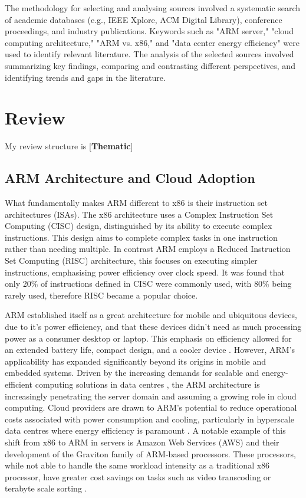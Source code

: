 \documentclass[conference]{IEEEtran}  %
\begin{document}
The methodology for selecting and analysing sources involved a systematic search of academic databases (e.g., IEEE Xplore, ACM Digital Library), conference proceedings, and industry publications. Keywords such as "ARM server," "cloud computing architecture," "ARM vs. x86," and "data center energy efficiency" were used to identify relevant literature. The analysis of the selected sources involved summarizing key findings, comparing and contrasting different perspectives, and identifying trends and gaps in the literature.


\section{Review} %

My review structure is [\textbf{Thematic}]
\subsection{ARM Architecture and Cloud Adoption}
What fundamentally makes ARM different to x86 is their instruction set architectures (ISAs).
The x86 architecture uses a Complex Instruction Set Computing (CISC) design, distinguished by its ability to execute complex instructions.
This design aims to complete complex tasks in one instruction rather than needing multiple. 
In contrast ARM employs a Reduced Instruction Set Computing (RISC) architecture, this focuses on executing simpler instructions, emphasising power efficiency over clock speed. \cite{ARM_RISC_vs_x86_SISC}
It was found that only 20\% of instructions defined in CISC were commonly used, with 80\% being rarely used, therefore RISC became a popular choice. \cite{instructions_CISC_vs_RISC}

ARM established itself as a great architecture for mobile and ubiquitous devices, due to it's power efficiency, and that these devices didn't need as much processing power as a consumer desktop or laptop.
This emphasis on efficiency allowed for an extended battery life, compact design, and a cooler device \cite{furber1988advantages}.
However, ARM's applicability has expanded significantly beyond its origins in mobile and embedded systems. Driven by the increasing demands for scalable and energy-efficient computing solutions in data centres \cite{ARM_to_server}, the ARM architecture is increasingly penetrating the server domain and assuming a growing role in cloud computing. Cloud providers are drawn to ARM's potential to reduce operational costs associated with power consumption and cooling, particularly in hyperscale data centres where energy efficiency is paramount \cite{datacentre_energy}. 
A notable example of this shift from x86 to ARM in servers is Amazon Web Services (AWS) and their development of the Graviton family of ARM-based processors.
These processors, while not able to handle the same workload intensity as a traditional x86 processor, have greater cost savings on tasks such as video transcoding or terabyte scale sorting \cite{AWS_ARM}.
\end{document}
